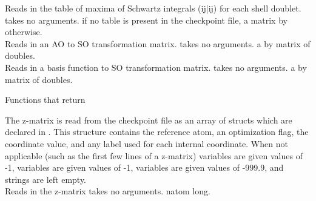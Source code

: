 \noindent {}
{Reads in the table of maxima of Schwartz integrals (ij|ij)
for each shell doublet.}
{takes no arguments.}
{ if no table is present in the checkpoint file,
a matrix  by  otherwise.} \\

\noindent {}
{Reads in an AO to SO transformation matrix.}
{takes no arguments.}
{a  by  matrix of doubles.} \\

\noindent {}
{Reads in a basis function to SO transformation matrix.}
{takes no arguments.}
{a  by  matrix of doubles.}

\begin{center}
Functions that return  
\end{center}
{The z-matrix is read from the checkpoint file as an array of
 structs which are declared in .
This structure contains the reference atom, an optimization flag, the
coordinate value, and any label used for each internal coordinate.
When not applicable (such as the first few lines of a z-matrix)
 variables are given values of -1,  variables are
given values of -1,  variables are given values of -999.9,
and  strings are left empty.} \\

\noindent {}
{Reads in the z-matrix}
{takes no arguments.}
{  natom long.} 
